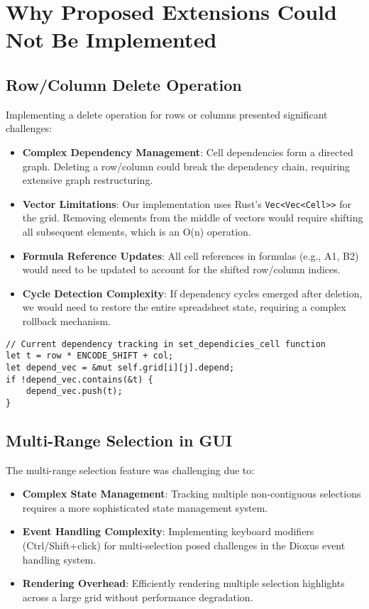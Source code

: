\documentclass[12pt]{article}
\begin{document}
\section{Why Proposed Extensions Could Not Be Implemented}

\subsection{Row/Column Delete Operation}
Implementing a delete operation for rows or columns presented significant challenges:
\begin{itemize}
    \item \textbf{Complex Dependency Management}: Cell dependencies form a directed graph. Deleting a row/column could break the dependency chain, requiring extensive graph restructuring.
    \item \textbf{Vector Limitations}: Our implementation uses Rust's \texttt{Vec<Vec<Cell>>} for the grid. Removing elements from the middle of vectors would require shifting all subsequent elements, which is an O(n) operation.
    \item \textbf{Formula Reference Updates}: All cell references in formulas (e.g., A1, B2) would need to be updated to account for the shifted row/column indices.
    \item \textbf{Cycle Detection Complexity}: If dependency cycles emerged after deletion, we would need to restore the entire spreadsheet state, requiring a complex rollback mechanism.
\end{itemize}

\begin{lstlisting}[caption={Current dependency tracking mechanism}]
// Current dependency tracking in set_dependicies_cell function
let t = row * ENCODE_SHIFT + col;
let depend_vec = &mut self.grid[i][j].depend;
if !depend_vec.contains(&t) {
    depend_vec.push(t);
}
\end{lstlisting}

\subsection{Multi-Range Selection in GUI}
The multi-range selection feature was challenging due to:
\begin{itemize}
    \item \textbf{Complex State Management}: Tracking multiple non-contiguous selections requires a more sophisticated state management system.
    \item \textbf{Event Handling Complexity}: Implementing keyboard modifiers (Ctrl/Shift+click) for multi-selection posed challenges in the Dioxus event handling system.
    \item \textbf{Rendering Overhead}: Efficiently rendering multiple selection highlights across a large grid without performance degradation.
\end{itemize}
\end{document}
